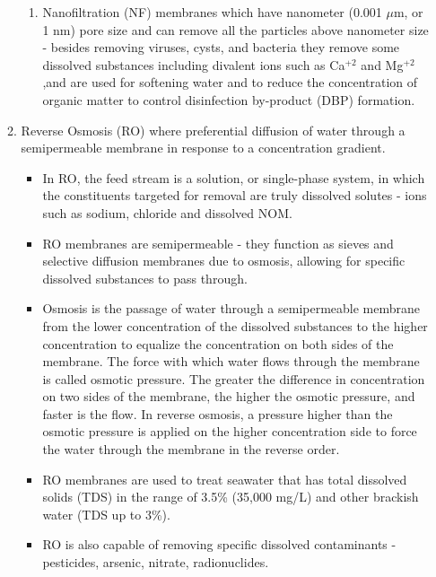 \begin{itemize}
\begin{enumerate}
\begin{enumerate}
\item Nanofiltration (NF) membranes which have nanometer (0.001 $\mu$m, or 1 nm) pore size and can remove all the particles above nanometer size - besides removing viruses, cysts, and bacteria they remove some dissolved substances including divalent ions such as Ca$^{+2}$ and Mg$^{+2}$,and are used for softening water and to reduce the concentration of organic matter to control disinfection by-product (DBP) formation.
\end{enumerate}
\item Reverse Osmosis (RO) where preferential diffusion of water through a semipermeable membrane in response to a concentration gradient.  
\begin{itemize}
\item In RO, the feed stream is a solution, or single-phase system, in which the constituents targeted for removal are truly dissolved solutes - ions such as sodium, chloride and dissolved NOM.
\item RO membranes are semipermeable - they function as sieves and selective diffusion membranes due to osmosis, allowing for specific dissolved substances to pass through. 
\item Osmosis is the passage of water through a semipermeable membrane from the lower concentration of the dissolved substances to the higher concentration to equalize the concentration on both sides of the membrane. The force with which water flows through the membrane is called osmotic pressure. The greater the difference in concentration on two sides of the membrane, the higher the osmotic pressure, and faster is the flow. In reverse osmosis, a pressure higher than the osmotic pressure is applied on the higher concentration side to force the water through the membrane in the reverse order. 
\item RO membranes  are used to treat seawater that has total dissolved solids (TDS) in the range of 3.5\% (35,000 mg/L) and other brackish water (TDS up to 3\%).  
\item RO is also capable of removing specific dissolved contaminants - pesticides, arsenic, nitrate, radionuclides.
\end{itemize}
\end{enumerate}


\end{itemize}
